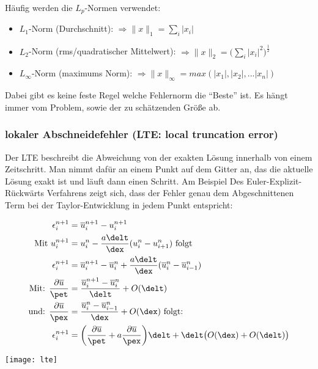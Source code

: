 H\"aufig werden die $L_p$-Normen verwendet:
\begin{itemize}
	\item $L_1$-Norm (Durchschnitt): $\Rightarrow \|x\|_1 = \sum_i |x_i|$
	\item $L_2$-Norm (rms/quadratischer Mittelwert): $\Rightarrow \|x\|_2 = \bigg(\sum_i |x_i|^2\bigg)^\frac{1}{2}$
	\item $L_\infty$-Norm (maximums Norm): $\Rightarrow \|x\|_\infty = max(|x_1|, |x_2|, ...|x_n|)$
\end{itemize}

Dabei gibt es keine feste Regel welche Fehlernorm die ``Beste'' ist. Es h\"angt immer vom Problem, sowie der zu sch\"atzenden Gr\"o\ss{}e ab.

\subsubsection{lokaler Abschneidefehler (LTE: local truncation error)}
Der LTE beschreibt die Abweichung von der exakten L\"osung innerhalb von einem Zeitschritt. Man nimmt daf\"ur an einem Punkt auf dem Gitter an, das die aktuelle L\"osung exakt ist und l\"auft dann einen Schritt. Am Beispiel Des Euler-Explizit-R\"uckw\"arts Verfahrens zeigt sich, dass der Fehler genau dem Abgeschnittenen Term bei der Taylor-Entwicklung in jedem Punkt entspricht:
\begin{multicols}{2}
\begin{align*}
	\epsilon^{n+1}_i &= \overline{u}^{n+1}_i - u^{n+1}_i \\
	\textrm{Mit } u^{n+1}_i &= u^n_i - \frac{a\delt}{\dex}(u^n_i - u^n_{i+1}) \textrm{ folgt} \\
	\epsilon^{n+1}_i &=  \overline{u}^{n+1}_i - \overline{u}^{n}_i + \frac{a\delt}{\dex}(\overline{u}^{n}_i - \overline{u}^{n}_{i-1}) \\
	\textrm{Mit: } \frac{\partial \overline{u}}{\pet} &= \frac{\overline{u}^{n+1}_i -\overline{u}^n_i}{\delt} + O(\delt)\\ 
	\textrm{und: } \frac{\partial\overline{u}}{\pex} &= \frac{\overline{u}^{n}_i -\overline{u}^n_{i-1}}{\dex} + O(\dex) \textrm{ folgt:}\\
	\epsilon^{n+1}_i &= \bigg(\frac{\partial \overline{u}}{\pet} + a\frac{\partial \overline{u}}{\pex}\bigg)\delt +  \delt \big(O(\dex) + O(\delt)\big)
\end{align*}
\par
\vspace{-2em}

\vfill\null
\columnbreak
\texttt{[image: lte]}

\end{multicols}

